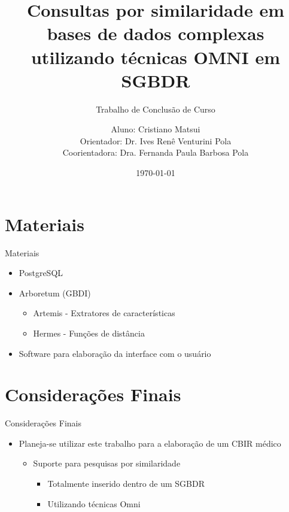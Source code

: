 \documentclass{beamer}
\begin{document}
\section{Materiais}

\begin{frame}{Materiais}
  \begin{itemize}
   \item PostgreSQL\newline
   \item Arboretum (GBDI)
   \begin{itemize}
      \item Artemis - Extratores de características
      \item Hermes - Funções de distância\newline
   \end{itemize}
   \item Software para elaboração da interface com o usuário   
  \end{itemize}

\end{frame}



\section{Considerações Finais}

\begin{frame}{Considerações Finais}
  \begin{itemize}
   \item Planeja-se utilizar este trabalho para a elaboração de um CBIR médico\newline
   \begin{itemize}
      \item Suporte para pesquisas por similaridade\newline
         \begin{itemize}
	    \item Totalmente inserido dentro de um SGBDR\newline
	    \item Utilizando técnicas Omni
	  \end{itemize}
   \end{itemize}
  \end{itemize}
\end{frame}


\title{Consultas por similaridade em bases de dados complexas utilizando técnicas OMNI em SGBDR}
\subtitle{Trabalho de Conclusão de Curso}
\author{
Aluno: Cristiano Matsui\\
Orientador: Dr. Ives Renê Venturini Pola\\
Coorientadora: Dra. Fernanda Paula Barbosa Pola
}
\date{\today}
\end{document}
